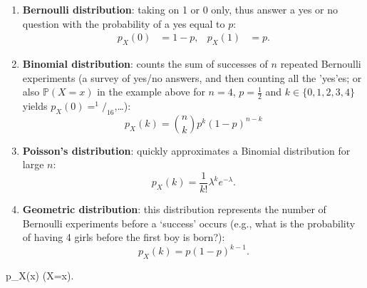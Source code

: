 \documentclass{article}
\begin{document}
\begin{spexample}
\begin{enumerate}\itemsep0em
    \item \textbf{Bernoulli distribution}: taking on 1 or 0 only, thus answer a yes or no question with the probability of a yes equal to $p$:
    \begin{align}
        p_X(0)&=1-p,& p_X(1)&=p.
    \end{align}
    \item \textbf{Binomial distribution}: counts the sum of successes of $n$ repeated Bernoulli experiments (a survey of yes/no answers, and then counting all the 'yes'es; or also $\mathbb{P}(X=x)$ in the example above for $n=4$, $p=\frac{1}{2}$ and $k\in\{0,1,2,3,4\}$ yields $p_X(0)=^{1\!\!\!}/_{\!16}$,\dots):
    \begin{equation}
        p_X(k) = \binom{n}{k}p^k(1-p)^{n-k}
    \end{equation}
    \item \textbf{Poisson's distribution}: quickly approximates a Binomial distribution for large $n$:
    \begin{equation}
        p_X(k) = \frac{1}{k!}\lambda^{k}e^{-\lambda}.
    \end{equation}
    \item \textbf{Geometric distribution}: this distribution represents the number of Bernoulli experiments before a `success' occurs (e.g., what is the probability of having 4 girls before the first boy is born?):
    \begin{equation}
        p_X(k)=p(1-p)^{k-1}.
    \end{equation}
\end{enumerate}
\end{spexample}
\begin{mymathbox}[ams align, title={Probability mass function (definition)}, colframe=blue!30!black, center title]
    p_X(x) \equiv {}(X=x).
\end{mymathbox}
\end{document}
